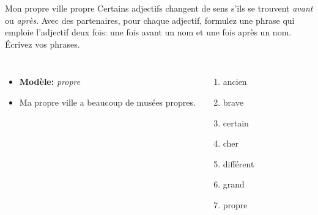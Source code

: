 \begin{frame}{Mon propre ville propre}
  Certains adjectifs changent de sens s'ils se trouvent \emph{avant} ou \emph{après}.
  Avec des partenaires, pour chaque adjectif, formulez une phrase qui emploie l'adjectif deux fois: une fois avant un nom et une fois après un nom.
  Écrivez vos phrases.
  \begin{columns}
      \begin{itemize}
        \item[] \textbf{Modèle:} \emph{propre}
        \item Ma propre ville a beaucoup de musées propres.
      \end{itemize}
      \begin{enumerate}
        \item ancien
        \item brave
        \item certain
        \item cher
        \item différent
        \item grand
        \item propre
      \end{enumerate}
  \end{columns}
\end{frame}